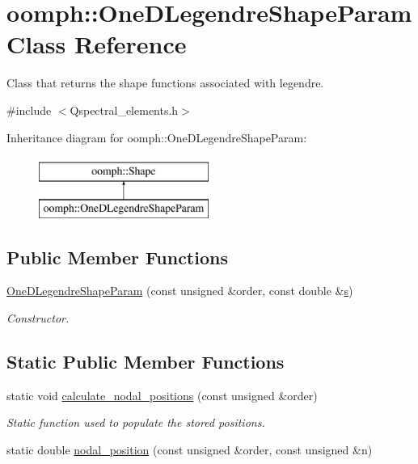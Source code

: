 \hypertarget{classoomph_1_1OneDLegendreShapeParam}{}\section{oomph\+:\+:One\+D\+Legendre\+Shape\+Param Class Reference}
\label{classoomph_1_1OneDLegendreShapeParam}


Class that returns the shape functions associated with legendre.  




{\ttfamily \#include $<$Qspectral\+\_\+elements.\+h$>$}

Inheritance diagram for oomph\+:\+:One\+D\+Legendre\+Shape\+Param\+:\begin{figure}[H]
\begin{center}
\leavevmode
\includegraphics[height=2.000000cm]{classoomph_1_1OneDLegendreShapeParam}
\end{center}
\end{figure}
\subsection*{Public Member Functions}
\begin{DoxyCompactItemize}
\item 
\hyperlink{classoomph_1_1OneDLegendreShapeParam_adb7ae440a08c6d7815eb52250a5564fe}{One\+D\+Legendre\+Shape\+Param} (const unsigned \&order, const double \&\hyperlink{cfortran_8h_ab7123126e4885ef647dd9c6e3807a21c}{s})
\begin{DoxyCompactList}\small\item\em Constructor. \end{DoxyCompactList}\end{DoxyCompactItemize}
\subsection*{Static Public Member Functions}
\begin{DoxyCompactItemize}
\item 
static void \hyperlink{classoomph_1_1OneDLegendreShapeParam_a3bebbcc4e518f0d1053635096b821d10}{calculate\+\_\+nodal\+\_\+positions} (const unsigned \&order)
\begin{DoxyCompactList}\small\item\em Static function used to populate the stored positions. \end{DoxyCompactList}\item 
static double \hyperlink{classoomph_1_1OneDLegendreShapeParam_aadd14533bf38cb1645961e95b2fcd93c}{nodal\+\_\+position} (const unsigned \&order, const unsigned \&n)
\end{DoxyCompactItemize}
